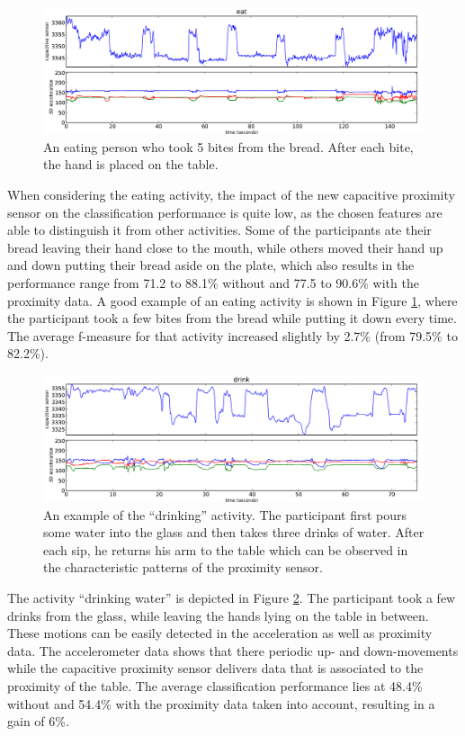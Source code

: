 \documentclass[runningheads,a4paper]{llncs}
\begin{document}
\begin{figure}
	\centering
		\includegraphics[width=\textwidth]{../Auswertung/images/eugen_6.pdf}
	\caption{An eating person who took 5 bites from the bread. After each bite, the hand is placed on the table.}
	\label{fig:eating}
\end{figure}

When considering the eating activity, the impact of the new capacitive proximity sensor on the classification performance is quite low, as the chosen features are able to distinguish it from other activities. Some of the participants ate their bread leaving their hand close to the mouth, while others moved their hand up and down putting their bread aside on the plate, which also results in the performance range from 71.2 to 88.1\% without and 77.5 to 90.6\% with the proximity data. A good example of an eating activity is shown in Figure \ref{fig:eating}, where the participant took a few bites from the bread while putting it down every time. The average f-measure for that activity increased slightly by 2.7\% (from 79.5\% to 82.2\%). 

\begin{figure}
	\centering
		\includegraphics[width=\textwidth]{../Auswertung/images/eugen_7.pdf}
	\caption{An example of the ``drinking'' activity. The participant first pours some water into the glass and then takes three drinks of water. After each sip, he returns his arm to the table which can be observed in the characteristic patterns of the proximity sensor.}
	\label{fig:drinking}
\end{figure}

The activity ``drinking water'' is depicted in Figure \ref{fig:drinking}. The participant took a few drinks from the glass, while leaving the hands lying on the table in between. These motions can be easily detected in the acceleration as well as proximity data. The accelerometer data shows that there periodic up- and down-movements while the capacitive proximity sensor delivers data that is associated to the proximity of the table. The average classification performance lies at 48.4\% without and 54.4\% with the proximity data taken into account, resulting in a gain of 6\%.
\end{document}
